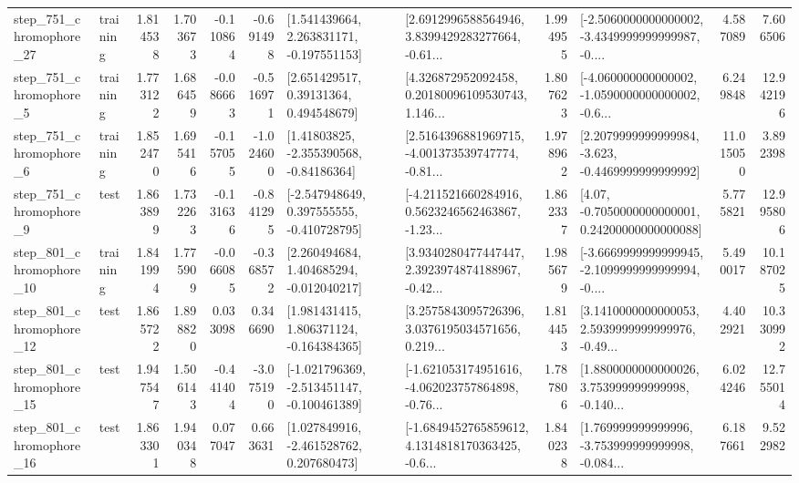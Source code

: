 \begin{tabular}{llrrrrllrlrr}
  step\_751\_chromophore\_27 &  training &      1.814538 &    1.703673 &     -0.110864 & -0.691498 &    [1.541439664, 2.263831171, -0.197551153] &  [2.6912996588564946, 3.8399429283277664, -0.61... &       1.994955 &  [-2.5060000000000002, -3.4349999999999987, -0.... &            4.587089 &          7.606506 \\
   step\_751\_chromophore\_5 &  training &      1.773122 &    1.686459 &     -0.086663 & -0.516971 &      [2.651429517, 0.39131364, 0.494548679] &  [4.326872952092458, 0.20180096109530743, 1.146... &       1.807623 &  [-4.060000000000002, -1.0590000000000002, -0.6... &            6.249848 &         12.942196 \\
   step\_751\_chromophore\_6 &  training &      1.852470 &    1.695416 &     -0.157055 & -1.024600 &     [1.41803825, -2.355390568, -0.84186364] &  [2.5164396881969715, -4.001373539747774, -0.81... &       1.978962 &  [2.2079999999999984, -3.623, -0.4469999999999992] &           11.015050 &          3.892398 \\
   step\_751\_chromophore\_9 &      test &      1.863899 &    1.732263 &     -0.131636 & -0.841295 &   [-2.547948649, 0.397555555, -0.410728795] &  [-4.211521660284916, 0.5623246562463867, -1.23... &       1.862337 &   [4.07, -0.7050000000000001, 0.24200000000000088] &            5.775821 &         12.995806 \\
  step\_801\_chromophore\_10 &  training &      1.841994 &    1.775909 &     -0.066085 & -0.368572 &    [2.260494684, 1.404685294, -0.012040217] &  [3.9340280477447447, 2.3923974874188967, -0.42... &       1.985679 &  [-3.6669999999999945, -2.1099999999999994, -0.... &            5.490017 &         10.187025 \\
  step\_801\_chromophore\_12 &      test &      1.865722 &    1.898820 &      0.033098 &  0.346690 &    [1.981431415, 1.806371124, -0.164384365] &  [3.2575843095726396, 3.0376195034571656, 0.219... &       1.814453 &  [3.1410000000000053, 2.5939999999999976, -0.49... &            4.402921 &         10.330992 \\
  step\_801\_chromophore\_15 &      test &      1.947547 &    1.506143 &     -0.441404 & -3.075190 &  [-1.021796369, -2.513451147, -0.100461389] &  [-1.621053174951616, -4.062023757864898, -0.76... &       1.787806 &  [1.8800000000000026, 3.753999999999998, -0.140... &            6.024246 &         12.755014 \\
  step\_801\_chromophore\_16 &      test &      1.863301 &    1.940348 &      0.077047 &  0.663631 &    [1.027849916, -2.461528762, 0.207680473] &  [-1.6849452765859612, 4.1314818170363425, -0.6... &       1.840238 &  [1.769999999999996, -3.753999999999998, -0.084... &            6.187661 &          9.522982 \\

\end{tabular}
